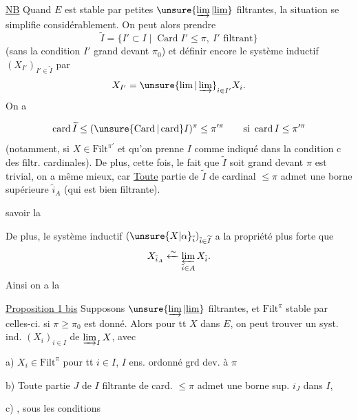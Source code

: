 \uline{NB} Quand $E$ est stable par petites $\unsure{\varinjlim|\underline{\lim}}$ filtrantes, la situation se simplifie considérablement. On peut alors prendre
\[
\widetilde I=\{I'\subset I\mid\operatorname{Card}I'\leq\pi,\ I'\text{ filtrant}\}
\]
(sans  la condition $I'$ grand devant $\pi_0$) et définir encore le système inductif $(X_{I'})_{I'\in\widetilde I}$ par
\[
X_{I'}=\unsure{\lim|\varinjlim}_{i\in I'}X_i.
\]
On a 

\[
\operatorname{card}\widetilde I\leq(\unsure{\operatorname{Card}|\operatorname{card}}I)^{\pi}\leq\pi'^\pi\qquad\text{si }\operatorname{card}I\leq\pi'^\pi
\]
(notamment, si $X\in\mathrm{Filt}^{\pi'}$ et qu'on prenne $I$ comme indiqué dans la condition c des filtr. cardinales). De plus, cette fois, le fait que $\widetilde I$ soit grand devant $\pi$ est trivial, on a même mieux,  car \uline{Toute} partie  de $\widetilde I$  de cardinal $\leq\pi$ admet une borne supérieure  $\tilde i_A$ (qui est bien filtrante).

savoir la  

De plus, le système inductif $(\unsure{X|\alpha}_{\tilde i})_{\tilde i\in\widetilde I}$ a la propriété plus forte que
\[
X_{\tilde i_A}\xleftarrow{\sim}\varprojlim_{\tilde i\in A}X_{\tilde i}.
\]
Ainsi on a la

\uline{Proposition 1 bis} Supposons   $\unsure{\varinjlim|\underline{\lim}}$ filtrantes, et $\mathrm{Filt}^{\pi}$ stable par celles-ci.  si $\pi\geq\pi_0$ est donné. Alors pour tt $X$ dans $E$, on peut trouver un syst. ind. $(X_i)_{i\in I}$ de $\varinjlim_I X$, avec

a) $X_i\in\mathrm{Filt}^{\pi}$ pour tt $i\in I$, $I$ ens. ordonné grd dev. à $\pi$

b) Toute partie $J$ de $I$ filtrante de card. $\leq\pi$ admet une borne sup. $i_J$ dans $I$,

c) , sous les conditions

